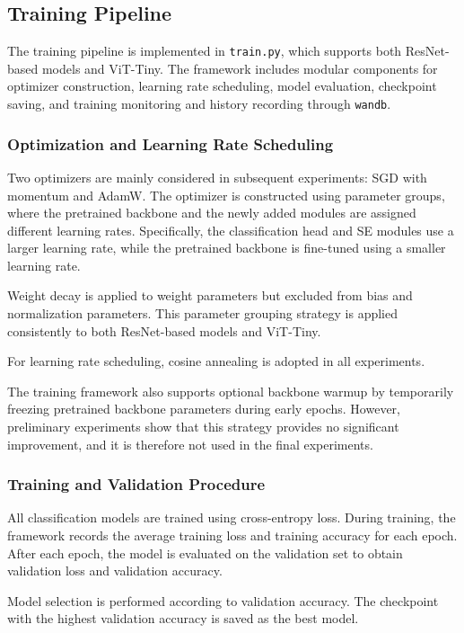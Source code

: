 \subsection{Training Pipeline}

The training pipeline is implemented in \texttt{train.py}, which supports both ResNet-based models and ViT-Tiny. The framework includes modular components for optimizer construction, learning rate scheduling, model evaluation, checkpoint saving, and training monitoring and history recording through \texttt{wandb}.

\subsubsection{Optimization and Learning Rate Scheduling}

Two optimizers are mainly considered in subsequent experiments: SGD with momentum and AdamW. The optimizer is constructed using parameter groups, where the pretrained backbone and the newly added modules are assigned different learning rates. Specifically, the classification head and SE modules use a larger learning rate, while the pretrained backbone is fine-tuned using a smaller learning rate.

Weight decay is applied to weight parameters but excluded from bias and normalization parameters. This parameter grouping strategy is applied consistently to both ResNet-based models and ViT-Tiny.

For learning rate scheduling, cosine annealing is adopted in all experiments.

The training framework also supports optional backbone warmup by temporarily freezing pretrained backbone parameters during early epochs. However, preliminary experiments show that this strategy provides no significant improvement, and it is therefore not used in the final experiments.

\subsubsection{Training and Validation Procedure}

All classification models are trained using cross-entropy loss. During training, the framework records the average training loss and training accuracy for each epoch. After each epoch, the model is evaluated on the validation set to obtain validation loss and validation accuracy.

Model selection is performed according to validation accuracy. The checkpoint with the highest validation accuracy is saved as the best model.
